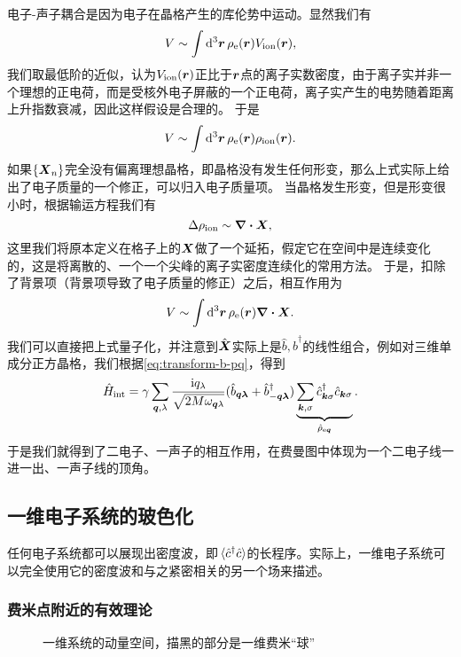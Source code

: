 \documentclass[hyperref, UTF8, a4paper]{ctexart}
\newcommand*{\ii}{\mathrm{i}}
\begin{document}
电子-声子耦合是因为电子在晶格产生的库伦势中运动。显然我们有
\[
    V \sim \int \dd[3]{\vb*{r}} \rho_\text{e}(\vb*{r}) V_\text{ion}(\vb*{r}),
\]
我们取最低阶的近似，认为$V_\text{ion}(\vb*{r})$正比于$\vb*{r}$点的离子实数密度，由于离子实并非一个理想的正电荷，而是受核外电子屏蔽的一个正电荷，离子实产生的电势随着距离上升指数衰减，因此这样假设是合理的。
于是
\[
    V \sim \int \dd[3]{\vb*{r}} \rho_\text{e}(\vb*{r}) \rho_\text{ion}(\vb*{r}).
\]
如果$\{\vb*{X}_n\}$完全没有偏离理想晶格，即晶格没有发生任何形变，那么上式实际上给出了电子质量的一个修正，可以归入电子质量项。
当晶格发生形变，但是形变很小时，根据输运方程我们有
\[
    \Delta \rho_\text{ion} \sim \div{\vb*{X}},
\]
这里我们将原本定义在格子上的$\vb*{X}$做了一个延拓，假定它在空间中是连续变化的，这是将离散的、一个一个尖峰的离子实密度连续化的常用方法。
于是，扣除了背景项（背景项导致了电子质量的修正）之后，相互作用为
\[
    V \sim \int \dd[3]{\vb*{r}} \rho_\text{e}(\vb*{r}) \div{\vb*{X}}.
\]
我们可以直接把上式量子化，并注意到$\hat{\vb*{X}}$实际上是$\hat{b}, \hat{b}^\dagger$的线性组合，例如对三维单成分正方晶格，我们根据\eqref{eq:transform-b-pq}，得到
\begin{equation}
    \hat{H}_\text{int} = \gamma \sum_{\vb*{q}, \lambda} \frac{\ii q_\lambda}{\sqrt{2 M \omega_{\vb*{q} \lambda}}} (\hat{b}_{\vb*{q} \vb*{\lambda}} + \hat{b}^\dagger_{-\vb*{q} \vb*{\lambda}}) \underbrace{\sum_{\vb*{k}, \sigma} \hat{c}^\dagger_{\vb*{k} \sigma} \hat{c}_{\vb*{k} \sigma}}_{\hat{\rho}_{\text{e} \vb*{q}}}.
    \label{eq:simple-phonon-electron-int}
\end{equation}
于是我们就得到了二电子、一声子的相互作用，在费曼图中体现为一个二电子线一进一出、一声子线的顶角。

\subsection{一维电子系统的玻色化}

任何电子系统都可以展现出密度波，即$\expval*{\hat{c}^\dagger \hat{c}}$的长程序。实际上，一维电子系统可以完全使用它的密度波和与之紧密相关的另一个场来描述。

\subsubsection{费米点附近的有效理论}

\begin{figure}
    \centering
    \caption{一维系统的动量空间，描黑的部分是一维费米“球”}
    \label{fig:one-dim-moment-space}
\end{figure}
\end{document}
